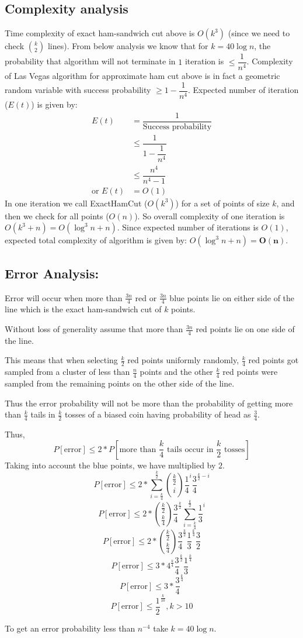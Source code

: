 \documentclass[a4paper]{article}
\newcommand{\V}[1]{\boldsymbol{#1}}
\begin{document}
\subsection*{Complexity analysis}
Time complexity of exact ham-sandwich cut above is $O(k^3)$ (since we need to check $k\choose2$ lines). From below analysis we know that for $k = 40\log n$, the probability that algorithm will not terminate in $1$ iteration is $\leq \dfrac{1}{n^4}$. Complexity of Las Vegas algorithm for approximate ham cut above is in fact a geometric random variable with success probability $\geq 1- \dfrac{1}{n^4}$. Expected number of iteration ($E(t)$) is given by:
\begin{align*} 
E(t) &= \dfrac{1}{\text{Success probability}} \\
	 &\leq \dfrac{1}{ 1- \dfrac{1}{n^4}} \\
	 &\leq \dfrac{n^4}{n^4 - 1} \\
\text{or } E(t) &= O(1)
\end{align*}
In one iteration we call ExactHamCut ($O(k^3)$) for a set of points of size $k$, and then we check for all points ($O(n)$). So overall complexity of one iteration is $O(k^3 + n) = O(\log^3 n + n)$. Since expected number of iterations is $O(1)$, expected total complexity of algorithm is given by: $O(\log^3 n + n) = \V{O(n)}$.


\subsection*{Error Analysis:}

Error will occur when more than $\frac{3n}{4}$ red or $\frac{3n}{4}$ blue points lie on either side of the line which is the exact ham-sandwich cut of $k$ points.

Without loss of generality assume that more than $\frac{3n}{4}$ red points lie on one side of the line.

This means that when selecting $\frac{k}{2}$ red points uniformly randomly, $\frac{k}{4}$ red points got sampled from a cluster of less than $\frac{n}{4}$ points and the other $\frac{k}{4}$ red points were sampled from the remaining points on the other side of the line.

Thus the error probability will not be more than the probability of getting more than $\frac{k}{4}$ tails in $\frac{k}{2}$ tosses of a biased coin having probability of head as $\frac{3}{4}$.

Thus,
$$P[\text{error}] \leq 2*P[\text{more than } \frac{k}{4} \text{ tails occur in } \frac{k}{2} \text{ tosses}]$$
Taking into account the blue points, we have multiplied by $2$.
$$P[\text{error}] \leq 2*\sum_{i=\frac{k}{4}}^{\frac{k}{2}}\binom{\frac{k}{2}}{i}\frac{1}{4}^{i}\frac{3}{4}^{\frac{k}{2}-i}$$
$$P[\text{error}] \leq 2*\binom{\frac{k}{2}}{\frac{k}{4}}\frac{3}{4}^{\frac{k}{2}}\sum_{i=\frac{k}{4}}^{\frac{k}{2}}\frac{1}{3}^{i}$$
$$P[\text{error}] \leq 2*\binom{\frac{k}{2}}{\frac{k}{4}}\frac{3}{4}^{\frac{k}{2}}\frac{1}{3}^{\frac{k}{4}}\frac{3}{2}$$
$$P[\text{error}] \leq 3*4^{\frac{k}{4}}\frac{3}{4}^{\frac{k}{2}}\frac{1}{3}^{\frac{k}{4}}$$
$$P[\text{error}] \leq 3*\frac{3}{4}^{\frac{k}{4}}$$
$$P[\text{error}] \leq \frac{1}{2}^{\frac{k}{10}}, k>10$$

To get an error probability less than $n^{-4}$ take $k = 40 \log n$.
\end{document}
